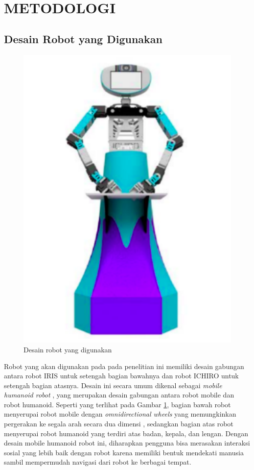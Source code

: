 \section{METODOLOGI}

\subsection{Desain Robot yang Digunakan}

\begin{figure} [ht] \centering
	\includegraphics[scale=0.50]{gambar/robot-design.png}
	\caption{Desain robot yang digunakan}
	\label{fig:RobotDesign}
\end{figure}

Robot yang akan digunakan pada pada penelitian ini memiliki desain gabungan antara robot IRIS \citep{Dikairono2020} untuk setengah bagian bawahnya dan robot ICHIRO \citep{Muhtadin2019} untuk setengah bagian atasnya.
Desain ini secara umum dikenal sebagai \emph{mobile humanoid robot} \citep{Mohamed2012}, yang merupakan desain gabungan antara robot mobile dan robot humanoid.
Seperti yang terlihat pada Gambar \ref{fig:RobotDesign}, bagian bawah robot menyerupai robot mobile dengan \emph{omnidirectional wheels} yang memungkinkan pergerakan ke segala arah secara dua dimensi \citep{Oliveira2008}, sedangkan bagian atas robot menyerupai robot humanoid yang terdiri atas badan, kepala, dan lengan.
Dengan desain mobile humanoid robot ini, diharapkan pengguna bisa merasakan interaksi sosial yang lebih baik dengan robot karena memiliki bentuk mendekati manusia \citep{Rossi2018} sambil mempermudah navigasi dari robot ke berbagai tempat.

